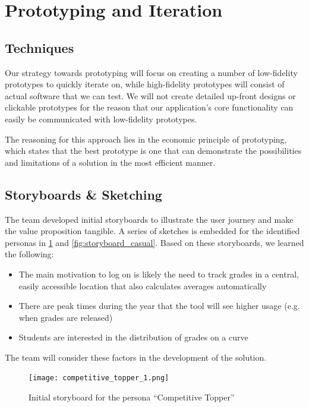 \section{Prototyping and Iteration}
\subsection{Techniques}
Our strategy towards prototyping will focus on creating a number of low-fidelity prototypes to quickly iterate on, while high-fidelity prototypes will consist of actual software that we can test. We will not create detailed up-front designs or clickable prototypes for the reason that our application's core functionality can easily be communicated with low-fidelity prototypes.

The reasoning for this approach lies in the economic principle of prototyping, which states that the best prototype is one that can demonstrate the possibilities and limitations of a solution in the most efficient manner.

\subsection{Storyboards \& Sketching}
The team developed initial storyboards to illustrate the user journey and make the value proposition tangible. A series of sketches is embedded for the identified personas in \cref{fig:storyboard_competitive} and \cref{fig:storyboard_casual}. Based on these storyboards, we learned the following:
\begin{itemize}
    \item The main motivation to log on is likely the need to track grades in a central, easily accessible location that also calculates averages automatically
    \item There are peak times during the year that the tool will see higher usage (e.g. when grades are released)
    \item Students are interested in the distribution of grades on a curve
\end{itemize}

The team will consider these factors in the development of the solution.

\begin{figure}[H]
    \centering
    \texttt{[image: competitive\_topper\_1.png]}
    \caption{Initial storyboard for the persona ``Competitive Topper''}
    \label{fig:storyboard_competitive}
\end{figure}

